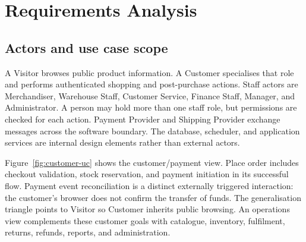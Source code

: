 \chapter{Requirements Analysis}
\section{Actors and use case scope}
A Visitor browses public product information. A Customer specialises that role and performs authenticated shopping and post-purchase actions. Staff actors are Merchandiser, Warehouse Staff, Customer Service, Finance Staff, Manager, and Administrator. A person may hold more than one staff role, but permissions are checked for each action. Payment Provider and Shipping Provider exchange messages across the software boundary. The database, scheduler, and application services are internal design elements rather than external actors.

Figure~\ref{fig:customer-uc} shows the customer/payment view. Place order includes checkout validation, stock reservation, and payment initiation in its successful flow. Payment event reconciliation is a distinct externally triggered interaction: the customer's browser does not confirm the transfer of funds. The generalisation triangle points to Visitor so Customer inherits public browsing. An operations view complements these customer goals with catalogue, inventory, fulfilment, returns, refunds, reports, and administration.

